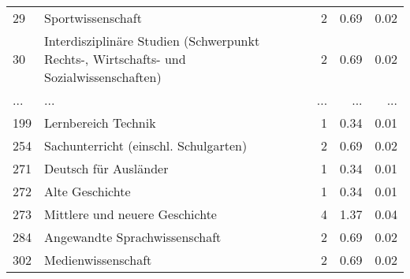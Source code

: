 \begin{longtable}{lXrrr}
        29 & \multicolumn{1}{X}{Sportwissenschaft} & %
          \num{2} &
          \num[round-mode=places,round-precision=2]{0,69} &
          \num[round-mode=places,round-precision=2]{0,02} \\
        30 & \multicolumn{1}{X}{Interdisziplinäre Studien (Schwerpunkt Rechts-, Wirtschafts- und Sozialwissenschaften)} & %
          \num{2} &
          \num[round-mode=places,round-precision=2]{0,69} &
          \num[round-mode=places,round-precision=2]{0,02} \\
       ... & ... & ... & ... & ... \\
        199 & \multicolumn{1}{X}{Lernbereich Technik} & %
          \num{1} &
          \num[round-mode=places,round-precision=2]{0,34} &
          \num[round-mode=places,round-precision=2]{0,01} \\

        254 & \multicolumn{1}{X}{Sachunterricht (einschl. Schulgarten)} & %
          \num{2} &
          \num[round-mode=places,round-precision=2]{0,69} &
          \num[round-mode=places,round-precision=2]{0,02} \\

        271 & \multicolumn{1}{X}{Deutsch für Ausländer} & %
          \num{1} &
          \num[round-mode=places,round-precision=2]{0,34} &
          \num[round-mode=places,round-precision=2]{0,01} \\

        272 & \multicolumn{1}{X}{Alte Geschichte} & %
          \num{1} &
          \num[round-mode=places,round-precision=2]{0,34} &
          \num[round-mode=places,round-precision=2]{0,01} \\

        273 & \multicolumn{1}{X}{Mittlere und neuere Geschichte} & %
          \num{4} &
          \num[round-mode=places,round-precision=2]{1,37} &
          \num[round-mode=places,round-precision=2]{0,04} \\

        284 & \multicolumn{1}{X}{Angewandte Sprachwissenschaft} & %
          \num{2} &
          \num[round-mode=places,round-precision=2]{0,69} &
          \num[round-mode=places,round-precision=2]{0,02} \\

        302 & \multicolumn{1}{X}{Medienwissenschaft} & %
          \num{2} &
          \num[round-mode=places,round-precision=2]{0,69} &
          \num[round-mode=places,round-precision=2]{0,02} \\


\end{longtable}
